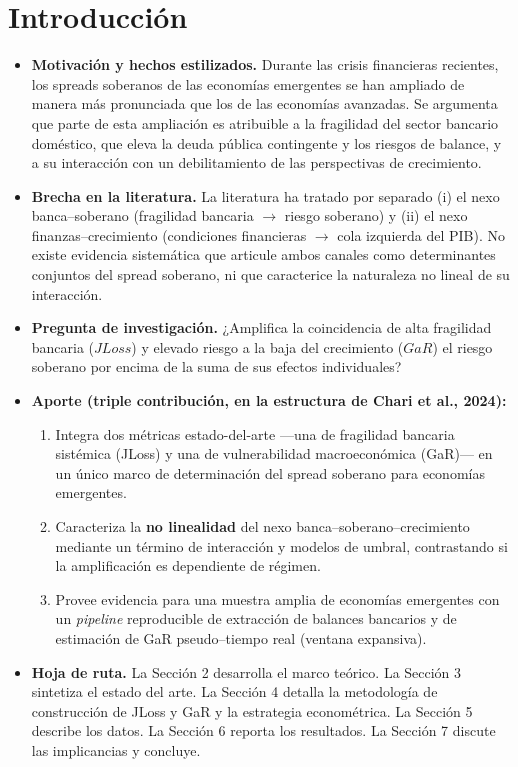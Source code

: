 \documentclass[5p,times,twocolumn,authoryear]{elsarticle}
\begin{document}
\section{Introducción}

\begin{itemize}
    \item \textbf{Motivación y hechos estilizados.} Durante las crisis financieras recientes, los spreads soberanos de las economías emergentes se han ampliado de manera más pronunciada que los de las economías avanzadas. Se argumenta que parte de esta ampliación es atribuible a la fragilidad del sector bancario doméstico, que eleva la deuda pública contingente y los riesgos de balance, y a su interacción con un debilitamiento de las perspectivas de crecimiento.
    \item \textbf{Brecha en la literatura.} La literatura ha tratado por separado (i) el nexo banca–soberano (fragilidad bancaria $\rightarrow$ riesgo soberano) y (ii) el nexo finanzas–crecimiento (condiciones financieras $\rightarrow$ cola izquierda del PIB). No existe evidencia sistemática que articule ambos canales como determinantes conjuntos del spread soberano, ni que caracterice la naturaleza no lineal de su interacción.
    \item \textbf{Pregunta de investigación.} ¿Amplifica la coincidencia de alta fragilidad bancaria ($JLoss$) y elevado riesgo a la baja del crecimiento ($GaR$) el riesgo soberano por encima de la suma de sus efectos individuales?
    \item \textbf{Aporte (triple contribución, en la estructura de Chari et al., 2024):}
    \begin{enumerate}
        \item Integra dos métricas estado-del-arte —una de fragilidad bancaria sistémica (JLoss) y una de vulnerabilidad macroeconómica (GaR)— en un único marco de determinación del spread soberano para economías emergentes.
        \item Caracteriza la \textbf{no linealidad} del nexo banca–soberano–crecimiento mediante un término de interacción y modelos de umbral, contrastando si la amplificación es dependiente de régimen.
        \item Provee evidencia para una muestra amplia de economías emergentes con un \textit{pipeline} reproducible de extracción de balances bancarios y de estimación de GaR pseudo–tiempo real (ventana expansiva).
    \end{enumerate}
    \item \textbf{Hoja de ruta.} La Sección 2 desarrolla el marco teórico. La Sección 3 sintetiza el estado del arte. La Sección 4 detalla la metodología de construcción de JLoss y GaR y la estrategia econométrica. La Sección 5 describe los datos. La Sección 6 reporta los resultados. La Sección 7 discute las implicancias y concluye.
\end{itemize}
\end{document}
